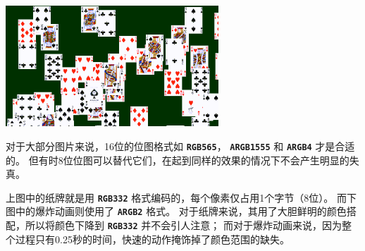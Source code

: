 \documentclass[10pt]{book}
\newcommand{\mach}[1]{\texttt{\textbf{#1}}}
\begin{document}
\begin{CJK}{UTF8}{gkai}
\begin{center}
\includegraphics[width=0.6\textwidth]{assets/0034.png}
\end{center}

对于大部分图片来说，16位的位图格式如
\mach{RGB565}，
\mach{ARGB1555} 和
\mach{ARGB4} 才是合适的。
但有时8位位图可以替代它们，在起到同样的效果的情况下不会产生明显的失真。

上图中的纸牌就是用 \mach{RGB332} 格式编码的，每个像素仅占用1个字节（8位）。
而下图中的爆炸动画则使用了 \mach{ARGB2} 格式。
对于纸牌来说，其用了大胆鲜明的颜色搭配，所以将颜色下降到 \mach{RGB332} 并不会引人注意；
而对于爆炸动画来说，因为整个过程只有0.25秒的时间，快速的动作掩饰掉了颜色范围的缺失。


\end{CJK}
\end{document}
